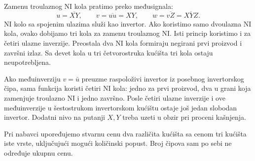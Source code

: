 
Zamenu troulaznog NI kola pratimo preko međusignala:
\[
u=\overline{XY},\qquad v=\overline{uu}=XY,\qquad
w=\overline{vZ}=\overline{XYZ}.
\]
NI kolo sa spojenim ulazima služi kao invertor. Ako koristimo samo dvoulazna NI kola, ovako dobijamo tri kola za zamenu troulaznog NI. Isti princip koristimo i za četiri ulazne inverzije. Preostala dva NI kola formiraju negirani prvi proizvod i završni izlaz. Sa devet kola u tri četvorostruka kućišta tri kola ostaju neupotrebljena.

Ako međuinverziju \(v=\bar u\) preuzme raspoloživi invertor iz posebnog invertorskog čipa, sama funkcija koristi četiri NI kola: jedno za prvi proizvod, dva u grani koja zamenjuje troulazno NI i jedno završno. Posle četiri ulazne inverzije i ove međuinverzije u šestostrukom invertorskom kućištu ostaje još jedan slobodan invertor. Dodatni nivo na putanji \(X,Y\) treba uzeti u obzir pri proceni kašnjenja.

Pri nabavci upoređujemo stvarnu cenu dva različita kućišta sa cenom tri kućišta iste vrste, uključujući mogući količinski popust. Broj čipova sam po sebi ne određuje ukupnu cenu.
